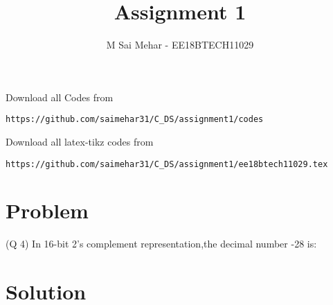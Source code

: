 \documentclass[journal,12pt,twocolumn]{IEEEtran}
\begin{document}
     \def\rightbox#1{\makebox[0in][r]{#1}}
     \def\centbox#1{\makebox[0in]{#1}}
     \def\topbox#1{\raisebox{-\baselineskip}[0in][0in]{#1}}
     \def\midbox#1{\raisebox{-0.5\baselineskip}[0in][0in]{#1}}
\vspace{3cm}
\title{Assignment 1}
\author{M Sai Mehar - EE18BTECH11029}
\maketitle
\newpage
\bigskip
\renewcommand{\thefigure}{\theenumi}
\renewcommand{\thetable}{\theenumi}
Download all Codes from 
%
\begin{lstlisting}
https://github.com/saimehar31/C_DS/assignment1/codes
\end{lstlisting}
Download all latex-tikz codes from 
%
\begin{lstlisting}
https://github.com/saimehar31/C_DS/assignment1/ee18btech11029.tex
\end{lstlisting}
\section{Problem}
(Q 4) In 16-bit 2's complement representation,the decimal number -28 is:  
\section{Solution}
\end{document}
